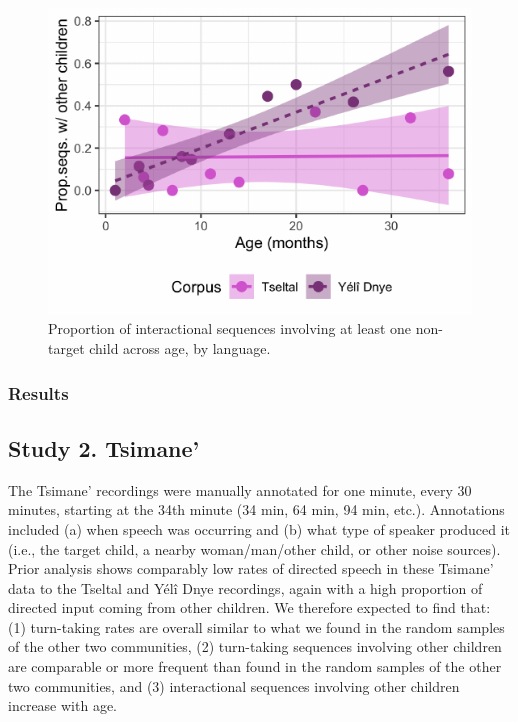\documentclass[10pt, letterpaper]{article}
\newenvironment{CodeChunk}{}{}
\begin{document}
\begin{CodeChunk}
\begin{figure}[h]

{\centering \includegraphics{figs/tseyel.is.fig-1} 

}

\caption[Proportion of interactional sequences involving at least one non-target child across age, by language]{Proportion of interactional sequences involving at least one non-target child across age, by language.}\label{fig:tseyel.is.fig}
\end{figure}
\end{CodeChunk}

\hypertarget{results}{%
\subsubsection{Results}\label{results}}

\hypertarget{study-2.-tsimane}{%
\subsection{Study 2. Tsimane'}\label{study-2.-tsimane}}

The Tsimane' recordings were manually annotated for one minute, every 30
minutes, starting at the 34th minute (34 min, 64 min, 94 min, etc.).
Annotations included (a) when speech was occurring and (b) what type of
speaker produced it (i.e., the target child, a nearby woman/man/other
child, or other noise sources). Prior analysis shows comparably low
rates of directed speech in these Tsimane' data to the Tseltal and Yélî
Dnye recordings, again with a high proportion of directed input coming
from other children. We therefore expected to find that: (1) turn-taking
rates are overall similar to what we found in the random samples of the
other two communities, (2) turn-taking sequences involving other
children are comparable or more frequent than found in the random
samples of the other two communities, and (3) interactional sequences
involving other children increase with age.
\end{document}
